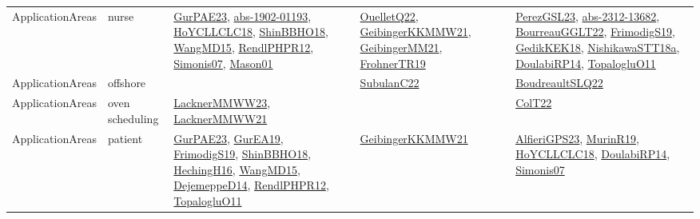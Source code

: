 {\begin{longtable}{lp{3cm}>{\raggedright}p{6cm}>{\raggedright}p{6cm}p{8cm}}
ApplicationAreas & nurse & \href{articles/GurPAE23.pdf}{GurPAE23}\cite{GurPAE23}, \href{articles/abs-1902-01193.pdf}{abs-1902-01193}\cite{abs-1902-01193}, \href{papers/HoYCLLCLC18.pdf}{HoYCLLCLC18}\cite{HoYCLLCLC18}, \href{articles/ShinBBHO18.pdf}{ShinBBHO18}\cite{ShinBBHO18}, \href{articles/WangMD15.pdf}{WangMD15}\cite{WangMD15}, \href{papers/RendlPHPR12.pdf}{RendlPHPR12}\cite{RendlPHPR12}, \href{articles/Simonis07.pdf}{Simonis07}\cite{Simonis07}, \href{articles/Mason01.pdf}{Mason01}\cite{Mason01} & \href{papers/OuelletQ22.pdf}{OuelletQ22}\cite{OuelletQ22}, \href{papers/GeibingerKKMMW21.pdf}{GeibingerKKMMW21}\cite{GeibingerKKMMW21}, \href{papers/GeibingerMM21.pdf}{GeibingerMM21}\cite{GeibingerMM21}, \href{papers/FrohnerTR19.pdf}{FrohnerTR19}\cite{FrohnerTR19} & \href{papers/PerezGSL23.pdf}{PerezGSL23}\cite{PerezGSL23}, \href{articles/abs-2312-13682.pdf}{abs-2312-13682}\cite{abs-2312-13682}, \href{articles/BourreauGGLT22.pdf}{BourreauGGLT22}\cite{BourreauGGLT22}, \href{papers/FrimodigS19.pdf}{FrimodigS19}\cite{FrimodigS19}, \href{articles/GedikKEK18.pdf}{GedikKEK18}\cite{GedikKEK18}, \href{papers/NishikawaSTT18a.pdf}{NishikawaSTT18a}\cite{NishikawaSTT18a}, \href{papers/DoulabiRP14.pdf}{DoulabiRP14}\cite{DoulabiRP14}, \href{articles/TopalogluO11.pdf}{TopalogluO11}\cite{TopalogluO11}\\
ApplicationAreas & offshore &  & \href{articles/SubulanC22.pdf}{SubulanC22}\cite{SubulanC22} & \href{papers/BoudreaultSLQ22.pdf}{BoudreaultSLQ22}\cite{BoudreaultSLQ22}\\
ApplicationAreas & oven scheduling & \href{articles/LacknerMMWW23.pdf}{LacknerMMWW23}\cite{LacknerMMWW23}, \href{papers/LacknerMMWW21.pdf}{LacknerMMWW21}\cite{LacknerMMWW21} &  & \href{articles/ColT22.pdf}{ColT22}\cite{ColT22}\\
ApplicationAreas & patient & \href{articles/GurPAE23.pdf}{GurPAE23}\cite{GurPAE23}, \href{articles/GurEA19.pdf}{GurEA19}\cite{GurEA19}, \href{papers/FrimodigS19.pdf}{FrimodigS19}\cite{FrimodigS19}, \href{articles/ShinBBHO18.pdf}{ShinBBHO18}\cite{ShinBBHO18}, \href{papers/HechingH16.pdf}{HechingH16}\cite{HechingH16}, \href{articles/WangMD15.pdf}{WangMD15}\cite{WangMD15}, \href{papers/DejemeppeD14.pdf}{DejemeppeD14}\cite{DejemeppeD14}, \href{papers/RendlPHPR12.pdf}{RendlPHPR12}\cite{RendlPHPR12}, \href{articles/TopalogluO11.pdf}{TopalogluO11}\cite{TopalogluO11} & \href{papers/GeibingerKKMMW21.pdf}{GeibingerKKMMW21}\cite{GeibingerKKMMW21} & \href{articles/AlfieriGPS23.pdf}{AlfieriGPS23}\cite{AlfieriGPS23}, \href{papers/MurinR19.pdf}{MurinR19}\cite{MurinR19}, \href{papers/HoYCLLCLC18.pdf}{HoYCLLCLC18}\cite{HoYCLLCLC18}, \href{papers/DoulabiRP14.pdf}{DoulabiRP14}\cite{DoulabiRP14}, \href{articles/Simonis07.pdf}{Simonis07}\cite{Simonis07}\\

\end{longtable}}
